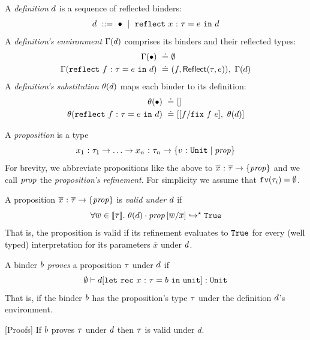 A \emph{definition} $\defn$ is a sequence of reflected binders:
%
$$\defn \ ::= \ \bullet \spmid \erefb{x}{\gtyp}{e}{\defn}$$
%
A \emph{definition's environment} $\env(\defn)$ comprises
its binders and their reflected types:
%
\begin{align*}
\aenv(\bullet)                    \defeq & \emptyset \\
\aenv(\erefb{f}{\gtyp}{e}{\defn}) \defeq & (f, \exacttype{\gtyp}{e}),\ \env(\defn) \\
\end{align*}
%
A \emph{definition's substitution} $\sto(\defn)$ maps each binder
to its definition:
%
\begin{align*}
\sto(\bullet)                     \defeq & \emptysto \\
\sto(\erefb{f}{\gtyp}{e}{\defn})  \defeq & \extendsto{f}{\efix{f}\ e}{\sto(\defn)}
\end{align*}

%
A \emph{proposition} is a type
%
$$\tbind{x_1}{\typ_1} \rightarrow \ldots
  \rightarrow \tbind{x_n}{\typ_n}
  \rightarrow \tref{v}{\tunit}{\ppn}$$
%
For brevity, we abbreviate propositions like the above to
%
$\tfun{\overline{x}}{\overline{\typ}}{\ttref{\ppn}}$
%
and we call $\ppn$ the \emph{proposition's refinement}.
%
For simplicity we assume that $\freevars{\typ_i} = \emptyset$.

%

A proposition $\tfun{\overline{x}}{\overline{\typ}}{\ttref{\ppn}}$
is \emph{valid under} $\defn$ if
%
$$\forall \overline{w} \in \interp{\overline{\typ}}.\
  \evalsto{\applysub{\sto(\defn)}{\SUBST{\ppn}{\overline{x}}{\overline{w}}}}{\etrue}$$
%
That is, the proposition is valid if its refinement
evaluates to $\etrue$ for every (well typed)
interpretation for its parameters $\overline{x}$
under $\defn$.

%
A binder $\bd$ \emph{proves} a proposition $\gtyp$ under $\defn$ if
$$\hastype{\emptyset}{\defn[\eletb{x}{\typ}{\bd}{\eunit}]}{\tunit}$$
%
That is, if the binder $\bd$ has the proposition's type $\gtyp$
under the definition $\defn$'s environment.

\begin{theorem}{[Proofs]} \label{thm:validity}
If $\bd$ proves $\typ$ under $\defn$ then $\typ$ is valid under $d$.
\end{theorem}

